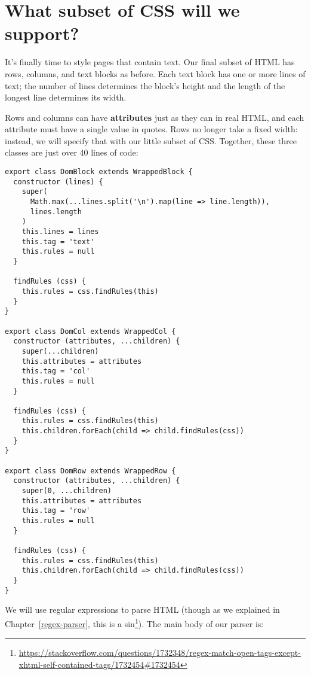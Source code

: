 \documentclass[krantzl]{krantz}
\newcommand{\chapref}[1]{Chapter~\ref{#1}}
\newcommand{\glossref}[1]{\textbf{#1}}
\newcommand{\hreffoot}[2]{{#1}\footnote{\href{#2}{#2}}}
\begin{document}
\section{What subset of CSS will we support?}\label{layout-engine-css}


It's finally time to style pages that contain text.
Our final subset of HTML has rows, columns, and text blocks as before.
Each text block has one or more lines of text;
the number of lines determines the block's height
and the length of the longest line determines its width.


Rows and columns can have \glossref{attributes} just as they can in real HTML,
and each attribute must have a single value in quotes.
Rows no longer take a fixed width:
instead,
we will specify that with our little subset of CSS.
Together,
these three classes are just over 40 lines of code:


\begin{lstlisting}[frame=single,frameround=tttt]
export class DomBlock extends WrappedBlock {
  constructor (lines) {
    super(
      Math.max(...lines.split('\n').map(line => line.length)),
      lines.length
    )
    this.lines = lines
    this.tag = 'text'
    this.rules = null
  }

  findRules (css) {
    this.rules = css.findRules(this)
  }
}

export class DomCol extends WrappedCol {
  constructor (attributes, ...children) {
    super(...children)
    this.attributes = attributes
    this.tag = 'col'
    this.rules = null
  }

  findRules (css) {
    this.rules = css.findRules(this)
    this.children.forEach(child => child.findRules(css))
  }
}

export class DomRow extends WrappedRow {
  constructor (attributes, ...children) {
    super(0, ...children)
    this.attributes = attributes
    this.tag = 'row'
    this.rules = null
  }

  findRules (css) {
    this.rules = css.findRules(this)
    this.children.forEach(child => child.findRules(css))
  }
}
\end{lstlisting}



We will use regular expressions to parse HTML
(though as we explained in \chapref{regex-parser},
\hreffoot{this is a sin}{https://stackoverflow.com/questions/1732348/regex-match-open-tags-except-xhtml-self-contained-tags/1732454\#1732454}).
The main body of our parser is:
\end{document}
